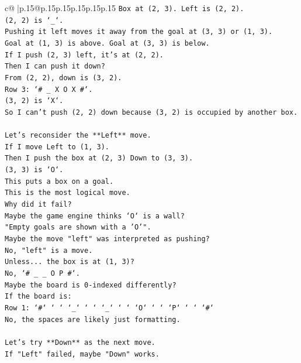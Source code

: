 \documentclass{article}
\begin{document}
{\begin{supertabular}{c@{$\;$}|p{.15\linewidth}@{}p{.15\linewidth}p{.15\linewidth}p{.15\linewidth}p{.15\linewidth}p{.15\linewidth}}
{{{\texttt{Box at (2, 3). Left is (2, 2).} \\
\texttt{(2, 2) is `\_`.} \\
\texttt{Pushing it left moves it away from the goal at (3, 3) or (1, 3).} \\
\texttt{Goal at (1, 3) is above. Goal at (3, 3) is below.} \\
\texttt{If I push (2, 3) left, it's at (2, 2).} \\
\texttt{Then I can push it down?} \\
\texttt{From (2, 2), down is (3, 2).} \\
\texttt{Row 3: `\# \_ X O X \#`.} \\
\texttt{(3, 2) is `X`.} \\
\texttt{So I can't push (2, 2) down because (3, 2) is occupied by another box.} \\
\\ 
\texttt{Let's reconsider the **Left** move.} \\
\texttt{If I move Left to (1, 3).} \\
\texttt{Then I push the box at (2, 3) Down to (3, 3).} \\
\texttt{(3, 3) is `O`.} \\
\texttt{This puts a box on a goal.} \\
\texttt{This is the most logical move.} \\
\texttt{Why did it fail?} \\
\texttt{Maybe the game engine thinks `O` is a wall?} \\
\texttt{"Empty goals are shown with a 'O'".} \\
\texttt{Maybe the move "left" was interpreted as pushing?} \\
\texttt{No, "left" is a move.} \\
\texttt{Unless... the box is at (1, 3)?} \\
\texttt{No, `\# \_ \_ O P \#`.} \\
\texttt{Maybe the board is 0{-}indexed differently?} \\
\texttt{If the board is:} \\
\texttt{Row 1: `\#` ` ` `\_` ` ` `\_` ` ` `O` ` ` `P` ` ` `\#`} \\
\texttt{No, the spaces are likely just formatting.} \\
\\ 
\texttt{Let's try **Down** as the next move.} \\
\texttt{If "Left" failed, maybe "Down" works.} \\
}}}
\end{supertabular}}
\end{document}
